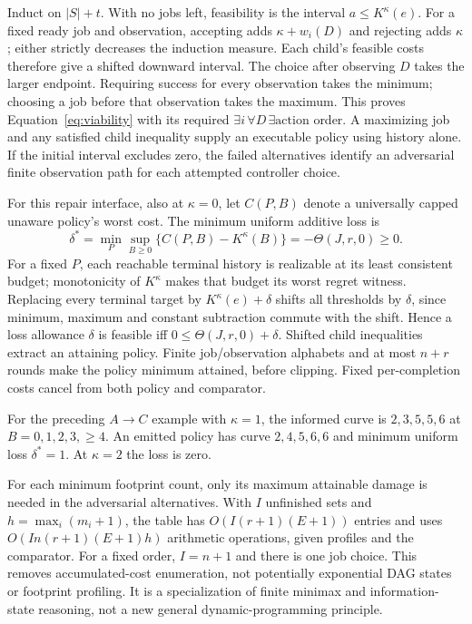 Induct on $|S|+t$. With no jobs left, feasibility is the interval $a\le K^\kappa(e)$. For a fixed ready job and observation, accepting adds $\kappa+w_i(D)$ and rejecting adds $\kappa$; either strictly decreases the induction measure. Each child's feasible costs therefore give a shifted downward interval. The choice after observing $D$ takes the larger endpoint. Requiring success for every observation takes the minimum; choosing a job before that observation takes the maximum. This proves Equation~\eqref{eq:viability} with its required $\exists i\,\forall D\,\exists\mathrm{action}$ order. A maximizing job and any satisfied child inequality supply an executable policy using history alone. If the initial interval excludes zero, the failed alternatives identify an adversarial finite observation path for each attempted controller choice.


For this repair interface, also at $\kappa=0$, let $C(P,B)$ denote a universally capped unaware policy's worst cost. The minimum uniform additive loss is
\[
 \delta^*=\min_P\sup_{B\ge0}\{C(P,B)-K^\kappa(B)\}
 =-\Theta(J,r,0)\ge0.
\]
For a fixed $P$, each reachable terminal history is realizable at its least consistent budget; monotonicity of $K^\kappa$ makes that budget its worst regret witness. Replacing every terminal target by $K^\kappa(e)+\delta$ shifts all thresholds by $\delta$, since minimum, maximum and constant subtraction commute with the shift. Hence a loss allowance $\delta$ is feasible iff $0\le\Theta(J,r,0)+\delta$. Shifted child inequalities extract an attaining policy. Finite job/observation alphabets and at most $n+r$ rounds make the policy minimum attained, before clipping. Fixed per-completion costs cancel from both policy and comparator.

For the preceding $A\to C$ example with $\kappa=1$, the informed curve is $2,3,5,5,6$ at $B=0,1,2,3,\ge4$. An emitted policy has curve $2,4,5,6,6$ and minimum uniform loss $\delta^*=1$. At $\kappa=2$ the loss is zero. 


For each minimum footprint count, only its maximum attainable damage is needed in the adversarial alternatives. With $I$ unfinished sets and $h=\max_i(m_i+1)$, the table has $O(I(r+1)(E+1))$ entries and uses $O(In(r+1)(E+1)h)$ arithmetic operations, given profiles and the comparator. For a fixed order, $I=n+1$ and there is one job choice. This removes accumulated-cost enumeration, not potentially exponential DAG states or footprint profiling. It is a specialization of finite minimax and information-state reasoning, not a new general dynamic-programming principle.

